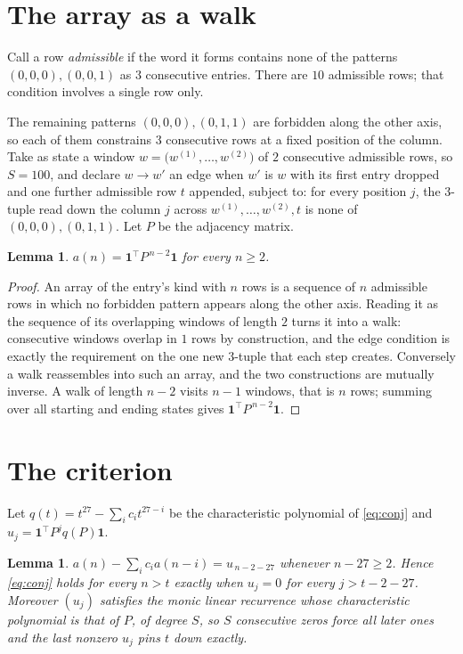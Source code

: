 \documentclass[11pt,a4paper]{article}
\theoremstyle{plain}
\newtheorem{lemma}[theorem]{Lemma}
\theoremstyle{definition}
\begin{document}
\section{The array as a walk}

Call a row \emph{admissible} if the word it forms contains none of the patterns
$(0,0,0), (0,0,1)$ as $3$ consecutive entries. There are $10$ admissible rows; that condition
involves a single row only.

The remaining patterns $(0,0,0), (0,1,1)$ are forbidden along the other axis, so each of them
constrains $3$ consecutive rows at a fixed position of the column. Take as state a
window $w=\bigl(w^{(1)},\dots,w^{(2)}\bigr)$ of $2$ consecutive admissible
rows, so $S=100$, and declare $w\to w'$ an edge when $w'$ is $w$ with its first entry
dropped and one further admissible row $t$ appended, subject to: for every position
$j$, the $3$-tuple read down the column $j$ across $w^{(1)},\dots,w^{(2)},t$
is none of $(0,0,0), (0,1,1)$. Let $P$ be the adjacency matrix.

\begin{lemma}\label{lem:walk}
$a(n)=\mathbf{1}^{\!\top}P^{\,n-2}\mathbf{1}$ for every $n\ge2$.
\end{lemma}

\begin{proof}
An array of the entry's kind with $n$ rows is a sequence of $n$ admissible rows in
which no forbidden pattern appears along the other axis. Reading it as the sequence of its
overlapping windows of length $2$ turns it into a walk: consecutive windows overlap in
$1$ rows by construction, and the edge condition is exactly the requirement on the one
new $3$-tuple that each step creates. Conversely a walk reassembles into such an array,
and the two constructions are mutually inverse. A walk of length $n-2$ visits $n-1$
windows, that is $n$ rows; summing over all starting and ending states gives
$\mathbf{1}^{\!\top}P^{\,n-2}\mathbf{1}$.
\end{proof}

\section{The criterion}

Let $q(t)=t^{27}-\sum_i c_i t^{27-i}$ be the characteristic polynomial of
\eqref{eq:conj} and $u_j=\mathbf{1}^{\!\top}P^{j}q(P)\mathbf{1}$.

\begin{lemma}\label{lem:crit}
$a(n)-\sum_i c_i a(n-i)=u_{\,n-2-27}$ whenever $n-27\ge2$. Hence
\eqref{eq:conj} holds for every $n>t$ exactly when $u_j=0$ for every
$j>t-2-27$. Moreover $(u_j)$ satisfies the monic linear recurrence whose
characteristic polynomial is that of $P$, of degree $S$, so $S$ consecutive zeros force all
later ones and the last nonzero $u_j$ pins $t$ down exactly.
\end{lemma}
\end{document}
